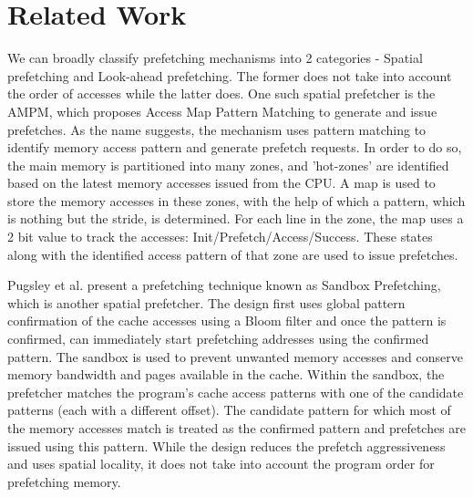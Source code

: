 \documentclass[10pt,conference]{IEEEtran}
\begin{document}
\section{Related Work}

We can broadly classify prefetching mechanisms into 2 categories - Spatial prefetching and Look-ahead prefetching. The former does not take into account the order of accesses while the latter does. One such spatial prefetcher is the AMPM\cite{AMPM}, which proposes Access Map Pattern Matching to generate and issue prefetches. As the name suggests, the mechanism uses pattern matching to identify memory access pattern and generate prefetch requests. In order to do so, the main memory is partitioned into many zones, and 'hot-zones' are identified based on the latest memory accesses issued from the CPU. A map is used to store the memory accesses in these zones, with the help of which a pattern, which is nothing but the stride, is determined. For each line in the zone, the map uses a 2 bit value to track the accesses: Init/Prefetch/Access/Success. These states along with the identified access pattern of that zone are used to issue prefetches.  

Pugsley et al. present a prefetching technique known as Sandbox Prefetching\cite{sandbox}, which is another spatial prefetcher. The design first uses global pattern confirmation of the cache accesses using a Bloom filter and once the pattern is confirmed, can immediately start prefetching addresses using the confirmed pattern. The sandbox is used to prevent unwanted memory accesses and conserve memory bandwidth and pages available in the cache. Within the sandbox, the prefetcher matches the program’s cache access patterns with one of the candidate patterns (each with a different offset). The candidate pattern for which most of the memory accesses match is treated as the confirmed pattern and prefetches are issued using this pattern. While the design reduces the prefetch aggressiveness and uses spatial locality, it does not take into account the program order for prefetching memory.
\end{document}

